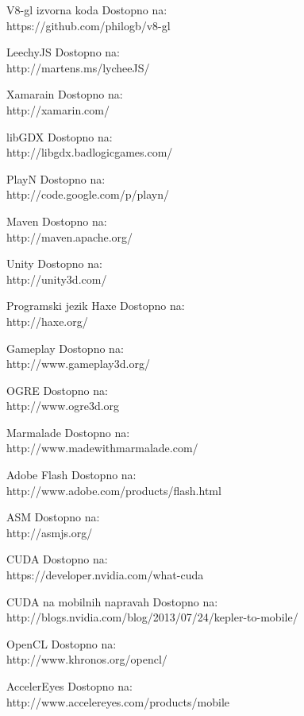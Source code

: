 \begin{thebibliography}{1}
 V8-gl izvorna koda 
Dostopno na:\\ https://github.com/philogb/v8-gl

 LeechyJS 
Dostopno na:\\ http://martens.ms/lycheeJS/

 Xamarain
Dostopno na:\\ http://xamarin.com/

 libGDX 
Dostopno na:\\ http://libgdx.badlogicgames.com/

 PlayN 
Dostopno na:\\ http://code.google.com/p/playn/

 Maven
Dostopno na:\\ http://maven.apache.org/

 Unity 
Dostopno na:\\ http://unity3d.com/

 Programski jezik Haxe
Dostopno na:\\ http://haxe.org/

 Gameplay 
Dostopno na:\\ http://www.gameplay3d.org/

 OGRE
Dostopno na:\\ http://www.ogre3d.org

 Marmalade
Dostopno na:\\ http://www.madewithmarmalade.com/

 Adobe Flash
Dostopno na:\\ http://www.adobe.com/products/flash.html

 ASM
Dostopno na:\\ http://asmjs.org/

 CUDA
Dostopno na:\\ https://developer.nvidia.com/what-cuda

 CUDA na mobilnih napravah
Dostopno na:\\ http://blogs.nvidia.com/blog/2013/07/24/kepler-to-mobile/

 OpenCL
Dostopno na:\\ http://www.khronos.org/opencl/

 AccelerEyes
Dostopno na:\\ http://www.accelereyes.com/products/mobile

\end{thebibliography}


